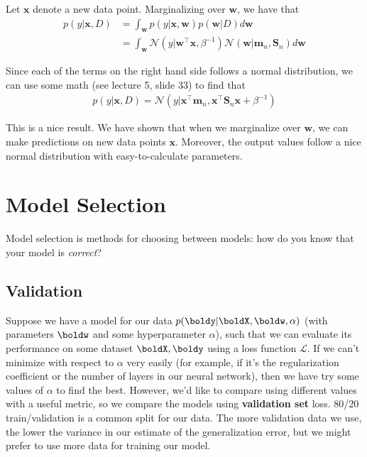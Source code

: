\documentclass[12pt,letterpaper]{article}
\newcommand{\1}{\mathbbm{1}}
\begin{document}
\noindent
Let $\mathbf{x}$ denote a new data point. Marginalizing over $\mathbf{w}$, we have that
\begin{align}
p(y| \mathbf{x}, D) &= \int_{\mathbf{w}} p(y|\mathbf{x}, \mathbf{w})p(\mathbf{w} | D) d\mathbf{w}\\
&= \int_{\mathbf{w}} \mathcal{N}(y|\mathbf{w}^\top\mathbf{x}, \beta^{-1}) \mathcal{N}(\mathbf{w}|\mathbf{m}_n, \mathbf{S}_n) d\mathbf{w} 
\end{align}

\noindent Since each of the terms on the right hand side follows a normal distribution, we can use some math (see lecture 5, slide 33) to find that
\begin{align}
p(y| \mathbf{x}, D) = \mathcal{N}(y| \mathbf{x}^\top\mathbf{m}_n, \mathbf{x}^\top\mathbf{S}_n\mathbf{x} + \beta^{-1})
\end{align}

\noindent
This is a nice result. We have shown that when we marginalize over $\mathbf{w}$, we can make predictions on new data points $\mathbf{x}$. Moreover, the output values follow a nice normal distribution with easy-to-calculate parameters.


\section{Model Selection}
Model selection is methods for choosing between models: how do you know that your model is \emph{correct}?

\subsection{Validation}
Suppose we have a model for our data $p(\boldy|\boldX, \boldw, \alpha)$ (with parameters $\boldw$ and some hyperparameter $\alpha$), such that we can evaluate its performance on some dataset $\boldX, \boldy$ using a loss function $\mathcal{L}$.
If we can't minimize with respect to $\alpha$ very easily (for example, if it's the regularization coefficient or the number of layers in our neural network), then we have try some values of $\alpha$ to find the best. However, we'd like to compare using different values with a useful metric, so we compare the models using \textbf{validation set} loss. 80/20 train/validation is a common split for our data. The more validation data we use, the lower the variance in our estimate of the generalization error, but we might prefer to use more data for training our model.
\end{document}
